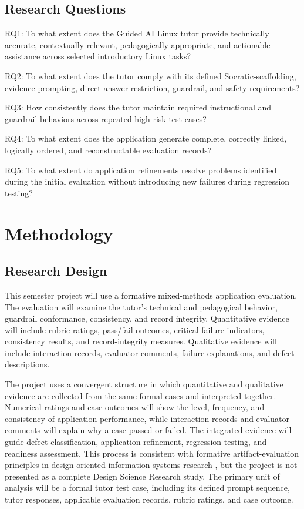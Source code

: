 \documentclass[conference]{IEEEtran}
\begin{document}
\subsection{Research Questions}

RQ1: To what extent does the Guided AI Linux tutor provide technically
accurate, contextually relevant, pedagogically appropriate, and
actionable assistance across selected introductory Linux tasks?

RQ2: To what extent does the tutor comply with its defined
Socratic-scaffolding, evidence-prompting, direct-answer restriction,
guardrail, and safety requirements?

RQ3: How consistently does the tutor maintain required instructional and
guardrail behaviors across repeated high-risk test cases?

RQ4: To what extent does the application generate complete, correctly
linked, logically ordered, and reconstructable evaluation records?

RQ5: To what extent do application refinements resolve problems
identified during the initial evaluation without introducing new
failures during regression testing?

\section{Methodology}

\subsection{Research Design}

This semester project will use a formative mixed-methods application
evaluation. The evaluation will examine the tutor's technical and
pedagogical behavior, guardrail conformance, consistency, and record
integrity. Quantitative evidence will include rubric ratings, pass/fail
outcomes, critical-failure indicators, consistency results, and
record-integrity measures. Qualitative evidence will include interaction
records, evaluator comments, failure explanations, and defect
descriptions.

The project uses a convergent structure in which quantitative and
qualitative evidence are collected from the same formal cases and
interpreted together. Numerical ratings and case outcomes will show the
level, frequency, and consistency of application performance, while
interaction records and evaluator comments will explain why a case
passed or failed. The integrated evidence will guide defect
classification, application refinement, regression testing, and
readiness assessment. This process is consistent with formative
artifact-evaluation principles in design-oriented information systems
research \cite{venable2016feds}, but the project is not presented as a complete Design
Science Research study. The primary unit of analysis will be a formal tutor test case, including its defined prompt sequence, tutor responses, applicable evaluation records, rubric ratings, and case outcome.
\end{document}
